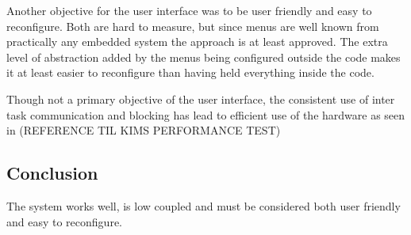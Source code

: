 Another objective for the user interface was to be user friendly and easy to reconfigure. Both are hard to measure, but since menus are well known from practically any embedded system the approach is at least approved. The extra level of abstraction added by the menus being configured outside the code makes it at least easier to reconfigure than having held everything inside the code.

Though not a primary objective of the user interface, the consistent use of inter task communication and blocking has lead to efficient use of the hardware as seen in (REFERENCE TIL KIMS PERFORMANCE TEST)

\subsection{Conclusion}
The system works well, is low coupled and must be considered both user friendly and easy to reconfigure.
